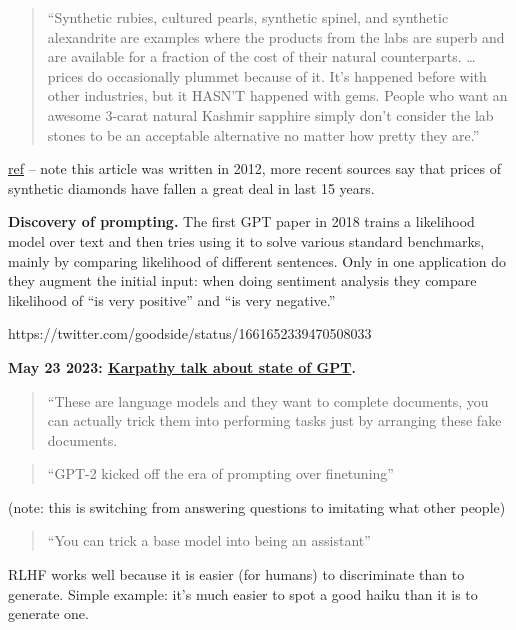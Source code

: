 \documentclass[
  11pt,
  letterpaper,
  DIV=11,
  numbers=noendperiod,
  oneside]{scrartcl}
\begin{document}
\begin{quote}
``Synthetic rubies, cultured pearls, synthetic spinel, and synthetic
alexandrite are examples where the products from the labs are superb and
are available for a fraction of the cost of their natural counterparts.
\ldots{} prices do occasionally plummet because of it. It's happened
before with other industries, but it HASN'T happened with gems. People
who want an awesome 3-carat natural Kashmir sapphire simply don't
consider the lab stones to be an acceptable alternative no matter how
pretty they are.''
\end{quote}

\href{https://www.pricescope.com/articles/why-arent-synthetic-diamonds-cheaper}{ref}
-- note this article was written in 2012, more recent sources say that
prices of synthetic diamonds have fallen a great deal in last 15 years.

\textbf{Discovery of prompting.} The first GPT paper in 2018 trains a
likelihood model over text and then tries using it to solve various
standard benchmarks, mainly by comparing likelihood of different
sentences. Only in one application do they augment the initial input:
when doing sentiment analysis they compare likelihood of ``is very
positive'' and ``is very negative.''

https://twitter.com/goodside/status/1661652339470508033

\textbf{May 23 2023:
\href{https://build.microsoft.com/en-US/sessions/db3f4859-cd30-4445-a0cd-553c3304f8e2}{Karpathy
talk about state of GPT}.}

\begin{quote}
``These are language models and they want to complete documents, you can
actually trick them into performing tasks just by arranging these fake
documents.
\end{quote}

\begin{quote}
``GPT-2 kicked off the era of prompting over finetuning''
\end{quote}

(note: this is switching from answering questions to imitating what
other people)

\begin{quote}
``You can trick a base model into being an assistant''
\end{quote}

RLHF works well because it is easier (for humans) to discriminate than
to generate. Simple example: it's much easier to spot a good haiku than
it is to generate one.
\end{document}
